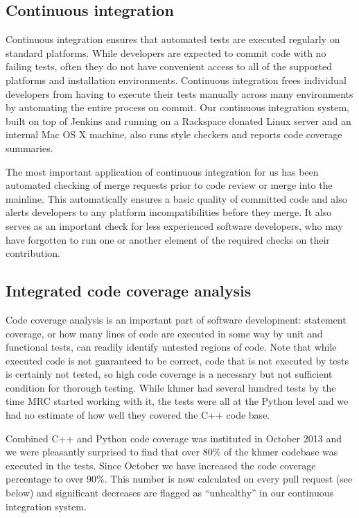 \documentclass[12pt]{article}
\begin{document}
\subsection{Continuous integration}

Continuous integration ensures that automated tests are executed
regularly on standard platforms.  While developers are expected to
commit code with no failing tests, often they do not have convenient
access to all of the supported platforms and installation
environments.  Continuous integration frees individual developers from
having to execute their tests manually across many environments by
automating the entire process on commit.  Our continuous integration
system, built on top of Jenkins and running on a Rackspace donated
Linux server and an internal Mac OS X machine, also runs style
checkers and reports code coverage summaries.

The most important application of continuous integration for us has
been automated checking of merge requests prior to code review or
merge into the mainline.  This automatically ensures a basic quality
of committed code and also alerts developers to any platform
incompatibilities before they merge.  It also serves as an important
check for less experienced software developers, who may have forgotten
to run one or another element of the required checks on their
contribution.


\subsection{Integrated code coverage analysis}

Code coverage analysis is an important part of software development:
statement coverage, or how many lines of code are executed in some way
by unit and functional tests, can readily identify untested regions of
code.  Note that while executed code is not guaranteed to be correct,
code that is not executed by tests is certainly not tested, so high
code coverage is a necessary but not sufficient condition for thorough
testing.  While khmer had several hundred tests by the time MRC
started working with it, the tests were all at the Python level and we
had no estimate of how well they covered the C++ code base.


Combined C++ and Python code coverage was instituted in October 2013
and we were pleasantly surprised to find that over 80\% of the khmer
codebase was executed in the tests.  Since October we have increased
the code coverage percentage to over 90\%. This number is now
calculated on every pull request (see below) and significant decreases
are flagged as ``unhealthy'' in our continuous integration system.
\end{document}
